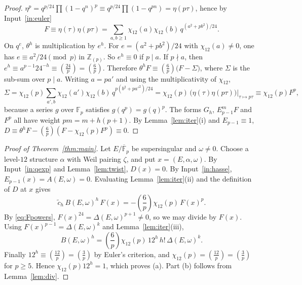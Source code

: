 \documentclass[11pt,a4paper]{article}
\numberwithin{equation}{section}
\theoremstyle{definition}
\theoremstyle{remark}
\newcommand{\Fp}{\mathbb F_p}
\newcommand{\Fb}{\overline{\mathbb F}_p}
\newcommand{\Z}{\mathbb Z}
\newcommand{\Lp}[1]{\left(\frac{#1}{p}\right)}
\newcommand{\leg}[2]{\left(\frac{#1}{#2}\right)}
\begin{document}
\begin{proof}
$\eta^p=q^{p/24}\prod(1-q^n)^p\equiv q^{p/24}\prod(1-q^{pn})=\eta(p\tau)$, hence by
Input~\ref{in:euler}
\[
F\equiv\eta(\tau)\eta(p\tau)=\sum_{a,b\ge1}\chi_{12}(a)\chi_{12}(b)\,q^{(a^2+pb^2)/24}.
\]
On $q^{e}$, $\theta^h$ is multiplication by $e^h$. For $e=(a^2+pb^2)/24$ with
$\chi_{12}(a)\ne0$, one has $e\equiv a^2/24\pmod p$ in $\Z_{(p)}$. So $e^h\equiv0$ if
$p\mid a$. If $p\nmid a$, then $e^h\equiv a^{p-1}24^{-h}\equiv\leg{24}{p}=\Lp6$. Therefore
$\theta^hF\equiv\Lp6\bigl(F-\Sigma\bigr)$, where $\Sigma$ is the sub-sum over $p\mid a$.
Writing $a=pa'$ and using the multiplicativity of $\chi_{12}$,
\[
\Sigma=\chi_{12}(p)\sum_{a',b}\chi_{12}(a')\chi_{12}(b)\,q^{p(b^2+pa'^2)/24}
=\chi_{12}(p)\,\bigl(\eta(\tau)\eta(p\tau)\bigr)\big|_{\tau\mapsto p\tau}\equiv\chi_{12}(p)F^p,
\]
because a series $g$ over $\Fp$ satisfies $g(q^p)=g(q)^p$. The forms $G_h$, $E_{p-1}^mF$ and
$F^p$ all have weight $pm=m+h(p+1)$. By Lemma~\ref{lem:iter}(i) and $E_{p-1}\equiv1$,
$D\equiv\theta^hF-\Lp6(F-\chi_{12}(p)F^p)\equiv0$.
\end{proof}

\begin{proof}[Proof of Theorem~\ref{thm:main}]
Let $E/\Fb$ be supersingular and $\omega\ne0$. Choose a level-$12$ structure $\alpha$ with
Weil pairing $\zeta$, and put $x=(E,\alpha,\omega)$. By Input~\ref{in:qexp} and
Lemma~\ref{lem:twist}, $D(x)=0$. By Input~\ref{in:hasse}, $E_{p-1}(x)=A(E,\omega)=0$.
Evaluating Lemma~\ref{lem:iter}(ii) and the definition of $D$ at $x$ gives
\[
\tilde c_h\,B(E,\omega)^h\,F(x)=-\Lp6\chi_{12}(p)\,F(x)^p .
\]
By \eqref{eq:Fpowers}, $F(x)^{24}=\Delta(E,\omega)^{p+1}\ne0$, so we may divide by $F(x)$. Using
$F(x)^{p-1}=\Delta(E,\omega)^k$ and Lemma~\ref{lem:iter}(iii),
\[
B(E,\omega)^h=\Lp6\chi_{12}(p)\,12^h\,h!\,\Delta(E,\omega)^k .
\]
Finally $12^h\equiv\leg{12}{p}=\Lp3$ by Euler's criterion, and $\chi_{12}(p)=\leg{12}{p}=\Lp3$
for $p\ge5$. Hence $\chi_{12}(p)12^h=1$, which proves (a). Part (b) follows from
Lemma~\ref{lem:div}.
\end{proof}
\end{document}
